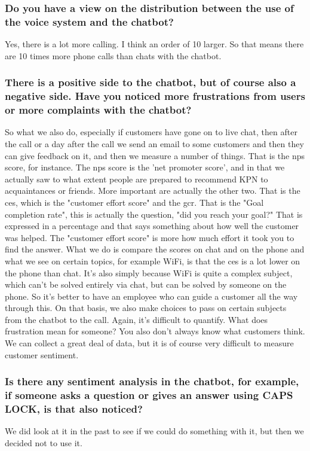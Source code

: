 \begin{appendices}
	\subsubsection{Do you have a view on the distribution between the use of the voice system and the chatbot?}
	Yes, there is a lot more calling. I think an order of 10 larger. So that means there are 10 times more phone calls than chats with the chatbot.
	
	\subsubsection{There is a positive side to the chatbot, but of course also a negative side.
		Have you noticed more frustrations from users or more complaints with the
		chatbot?}
	So what we also do, especially if customers have gone on to live chat, then after the call or a day after the call we send an email to some customers and then they can give feedback on it, and then we measure a number of things. That is the \acrshort{nps} score, for instance. The \acrshort{nps} score is the 'net promoter score', and in that we actually saw to what extent people are prepared to recommend KPN to acquaintances or friends. More important are actually the other two. That is the \acrshort{ces}, which is the "customer effort score" and the \acrshort{gcr}. That is the "Goal completion rate", this is actually the question, "did you reach your goal?" That is expressed in a percentage and that says something about how well the customer was helped. The "customer effort score" is more how much effort it took you to find the answer. What we do is compare the scores on chat and on the phone and what we see on certain topics, for example WiFi, is that the \acrshort{ces} is a lot lower on the phone than chat. It's also simply because WiFi is quite a complex subject, which can't be solved entirely via chat, but can be solved by someone on the phone. So it's better to have an employee who can guide a customer all the way through this. On that basis, we also make choices to pass on certain subjects from the chatbot to the call.  Again, it's difficult to quantify. What does frustration mean for someone? You also don't always know what customers think. We can collect a great deal of data, but it is of course very difficult to measure customer sentiment. 
	
	\subsubsection{Is there any sentiment analysis in the chatbot, for example, if someone asks a question or gives an answer using CAPS LOCK, is that also noticed?}
	We did look at it in the past to see if we could do something with it, but then we decided not to use it.
	

\end{appendices}
